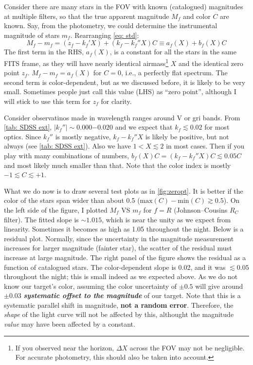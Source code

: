 Consider there are many stars in the FOV with known (catalogued) magnitudes at multiple filters, so that the true apparent magnitude $ M_f $ and color $ C $ are known. Say, from the photometry, we could determine the instrumental magnitude of stars $ m_f $. Rearranging \cref{eq: std}:
\begin{equation} \label{eq: zeropt}
  M_f - m_f = (z_f - k_f' X) + (k_f - k_f'' X) C \equiv a_f (X) + b_f (X) C
\end{equation}
The first term in the RHS, $ a_f (X) $, is a constant for all the stars in the same FITS frame, as they will have nearly identical airmass\footnote{If you observed near the horizon, $ \Delta X $ across the FOV may not be negligible. For accurate photometry, this should also be taken into account.} $ X $ and the identical zero point $ z_f $. $ M_f - m_f = a_f(X) $ for $ C = 0 $, i.e., a perfectly flat spectrum. The second term is color-dependent, but as we discussed before, it is likely to be very small. Sometimes people just call this value (LHS) as ``zero point'', although I will stick to use this term for $ z_f $ for clarity. 

\begin{ex}
  Consider observatinos made in wavelength ranges around V or gri bands. From \cref{tab: SDSS ext}, $ |k_f''| \sim 0.000 \mathrm{-} 0.020 $ and we expect that $ k_f \lesssim 0.02 $ for most optics. Since $ k_f'' $ is mostly negative, $ k_f - k_f'' X $ is likely be positive, but not always (see \cref{tab: SDSS ext}). Also we have $ 1 < X \lesssim 2 $ in most cases. Then if you play with many combinations of numbers, $ b_f(X) C = (k_f - k_f'' X) C \lesssim 0.05 C $ and most likely much smaller than that. Note that the color index is mostly $ -1 \lesssim C \lesssim +1 $.
\end{ex}

What we do now is to draw several test plots as in \cref{fig:zeropt}. It is better if the color of the stars span wider than about 0.5 ($ \mathrm{max}(C) - \mathrm{min} (C) \gtrsim 0.5 $). On the left side of the figure, I plotted $ M_f $ VS $ m_f $ for $ f = R $ (Johnson--Cousins $ R_C $ filter). The fitted slope is $ \sim 1.015 $, which is near the unity as we expect from linearity. Sometimes it becomes as high as 1.05 throughout the night. Below is a residual plot. Normally, since the uncertainty in the magnitude measurement increases for larger magnitude (fainter star), the scatter of the residual must increase at large magnitude. The right panel of the figure shows the residual as a function of catalogued stars. The color-dependent slope is 0.02, and it was $ \lesssim 0.05 $ throughout the night; this is small indeed as we expected above. As we do not know our target's color, assuming the color uncertainty of $ \pm 0.5 $ will give around $ \pm 0.03 $ \textbf{\emph{systematic offset to the magnitude}} of our target. Note that this is a systematic parallel shift in magnitude, \textbf{not a random error}. Therefore, the \emph{shape} of the light curve will not be affected by this, althought the magnitude \emph{value} may have been affected by a constant.

